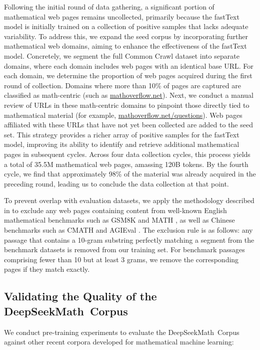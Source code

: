 \begin{itemize}[topsep=0pt]
Following the initial round of data gathering, a significant portion of mathematical web pages remains uncollected, primarily because the fastText model is initially trained on a collection of positive samples that lacks adequate variability. To address this, we expand the seed corpus by incorporating further mathematical web domains, aiming to enhance the effectiveness of the fastText model. Concretely, we segment the full Common Crawl dataset into separate domains, where each domain includes web pages with an identical base URL. For each domain, we determine the proportion of web pages acquired during the first round of collection. Domains where more than 10\% of pages are captured are classified as math-centric (such as \url{mathoverflow.net}). Next, we conduct a manual review of URLs in these math-centric domains to pinpoint those directly tied to mathematical material (for example, \url{mathoverflow.net/questions}). Web pages affiliated with these URLs that have not yet been collected are added to the seed set. This strategy provides a richer array of positive samples for the fastText model, improving its ability to identify and retrieve additional mathematical pages in subsequent cycles. Across four data collection cycles, this process yields a total of 35.5M mathematical web pages, amassing 120B tokens. By the fourth cycle, we find that approximately 98\% of the material was already acquired in the preceding round, leading us to conclude the data collection at that point.

To prevent overlap with evaluation datasets, we apply the methodology described in \cite{deepseek-coder} to exclude any web pages containing content from well-known English mathematical benchmarks such as GSM8K \citep{gsm8k} and MATH \citep{MATH}, as well as Chinese benchmarks such as CMATH \citep{wei2023cmath} and AGIEval \citep{agieval}. The exclusion rule is as follows: any passage that contains a 10-gram substring perfectly matching a segment from the benchmark datasets is removed from our training set. For benchmark passages comprising fewer than 10 but at least 3 grams, we remove the corresponding pages if they match exactly.

\subsection{Validating the Quality of the DeepSeekMath~Corpus}

We conduct pre-training experiments to evaluate the DeepSeekMath~Corpus against other recent corpora developed for mathematical machine learning:


\end{itemize}
